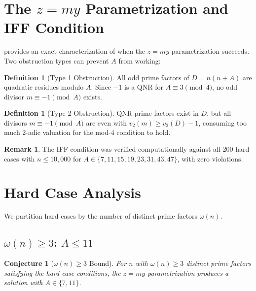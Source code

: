 \documentclass[11pt,a4paper]{article}
\theoremstyle{plain}
\theoremstyle{plain}
\newtheorem{conjecture}[theorem]{Conjecture}
\theoremstyle{definition}
\newtheorem{definition}[theorem]{Definition}
\newtheorem{remark}[theorem]{Remark}
\numberwithin{equation}{section}
\begin{document}
\clearpage

\section{The \texorpdfstring{$z = my$}{z=my} Parametrization and IFF Condition}

 provides an exact characterization of when the $z = my$ parametrization succeeds. Two obstruction types can prevent $A$ from working:

\begin{definition}[Type 1 Obstruction]
All odd prime factors of $D = n(n+A)$ are quadratic residues modulo $A$. Since $-1$ is a QNR for $A \equiv 3 \pmod{4}$, no odd divisor $m \equiv -1 \pmod{A}$ exists.
\end{definition}

\begin{definition}[Type 2 Obstruction]
QNR prime factors exist in $D$, but all divisors $m \equiv -1 \pmod{A}$ are even with $v_2(m) \geq v_2(D) - 1$, consuming too much 2-adic valuation for the mod-4 condition to hold.
\end{definition}

\begin{remark}
The IFF condition was verified computationally against all 200 hard cases with $n \leq 10{,}000$ for $A \in \{7, 11, 15, 19, 23, 31, 43, 47\}$, with zero violations.
\end{remark}

\clearpage

\section{Hard Case Analysis}

We partition hard cases by the number of distinct prime factors $\omega(n)$.

\subsection{\texorpdfstring{$\omega(n) \geq 3$}{omega(n) >= 3}: \texorpdfstring{$A \leq 11$}{A <= 11}}

\begin{conjecture}[$\omega(n) \geq 3$ Bound]\label{conj:omega3}
For $n$ with $\omega(n) \geq 3$ distinct prime factors satisfying the hard case conditions, the $z = my$ parametrization produces a solution with $A \in \{7, 11\}$.
\end{conjecture}
\end{document}
